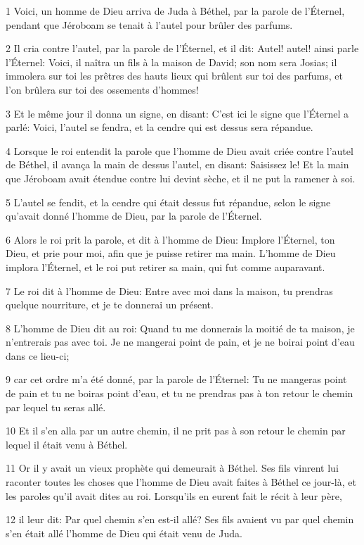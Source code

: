 \par 1 Voici, un homme de Dieu arriva de Juda à Béthel, par la parole de l'Éternel, pendant que Jéroboam se tenait à l'autel pour brûler des parfums.
\par 2 Il cria contre l'autel, par la parole de l'Éternel, et il dit: Autel! autel! ainsi parle l'Éternel: Voici, il naîtra un fils à la maison de David; son nom sera Josias; il immolera sur toi les prêtres des hauts lieux qui brûlent sur toi des parfums, et l'on brûlera sur toi des ossements d'hommes!
\par 3 Et le même jour il donna un signe, en disant: C'est ici le signe que l'Éternel a parlé: Voici, l'autel se fendra, et la cendre qui est dessus sera répandue.
\par 4 Lorsque le roi entendit la parole que l'homme de Dieu avait criée contre l'autel de Béthel, il avança la main de dessus l'autel, en disant: Saisissez le! Et la main que Jéroboam avait étendue contre lui devint sèche, et il ne put la ramener à soi.
\par 5 L'autel se fendit, et la cendre qui était dessus fut répandue, selon le signe qu'avait donné l'homme de Dieu, par la parole de l'Éternel.
\par 6 Alors le roi prit la parole, et dit à l'homme de Dieu: Implore l'Éternel, ton Dieu, et prie pour moi, afin que je puisse retirer ma main. L'homme de Dieu implora l'Éternel, et le roi put retirer sa main, qui fut comme auparavant.
\par 7 Le roi dit à l'homme de Dieu: Entre avec moi dans la maison, tu prendras quelque nourriture, et je te donnerai un présent.
\par 8 L'homme de Dieu dit au roi: Quand tu me donnerais la moitié de ta maison, je n'entrerais pas avec toi. Je ne mangerai point de pain, et je ne boirai point d'eau dans ce lieu-ci;
\par 9 car cet ordre m'a été donné, par la parole de l'Éternel: Tu ne mangeras point de pain et tu ne boiras point d'eau, et tu ne prendras pas à ton retour le chemin par lequel tu seras allé.
\par 10 Et il s'en alla par un autre chemin, il ne prit pas à son retour le chemin par lequel il était venu à Béthel.
\par 11 Or il y avait un vieux prophète qui demeurait à Béthel. Ses fils vinrent lui raconter toutes les choses que l'homme de Dieu avait faites à Béthel ce jour-là, et les paroles qu'il avait dites au roi. Lorsqu'ils en eurent fait le récit à leur père,
\par 12 il leur dit: Par quel chemin s'en est-il allé? Ses fils avaient vu par quel chemin s'en était allé l'homme de Dieu qui était venu de Juda.
